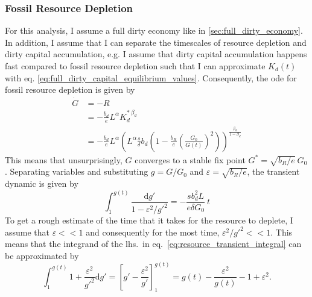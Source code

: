 \subsubsection{Fossil Resource Depletion}
\label{sec:resource_depletion}


For this analysis, I assume a full dirty economy like in \ref{sec:full_dirty_economy}. In addition, I assume that I can separate the timescales of resource depletion and dirty capital accumulation, e.g. I assume that dirty capital accumulation happens fast compared to fossil resource depletion such that I can approximate $K_d(t)$ with eq. \ref{eq:full_dirty_capital_equilibrium_values}. Consequently, the ode for fossil resource depletion is given by
\begin{align}
	\dot{G} &= -R \nonumber \\
        &= -\frac{b_d}{e}L^{\alpha}K_d^{*\ \beta_d} \nonumber \\
	&= - \frac{b_d}{e}L^{\alpha}\left(L^{\alpha} \frac{s}{\delta}b_d\left( 1-\frac{b_R}{e}\left( \frac{G_0}{G(t)} \right)^2 \right) \right)^{\frac{\beta_d}{1-\beta_d}}
	\label{eq:resource_deprec_approx}
\end{align}
This means that unsurprisingly, $G$ converges to a stable fix point $G^* = \sqrt{b_R/e}\ G_0$. Separating variables and substituting $g = G/G_0$ and $\varepsilon = \sqrt{b_R/e}$, the transient dynamic is given by
\begin{equation}
	\int_1^{g(t)} \frac{{\mathrm d} g'}{1 - \varepsilon^2/g'^2} = - \frac{s b_d^2 L}{e \delta G_0} \ t
	\label{eq:resource_transient_integral}
\end{equation}
To get a rough estimate of the time that it takes for the resource to deplete, I assume that $\varepsilon << 1$ and consequently for the most time, $\varepsilon^2/g'^2 << 1$.
This means that the integrand of the lhs.\ in eq.~\eqref{eq:resource_transient_integral} can be approximated by
\begin{equation}
	\int_1^{g(t)}1+\frac{\varepsilon^2}{g'^2} {\mathrm d}g' = \left[ g' - \frac{\varepsilon^2}{g'} \right]_1^{g(t)} = g(t) - \frac{\varepsilon^2}{g(t)} -1+\varepsilon^2.
	\label{eq:resource_transient_solution}
\end{equation}

